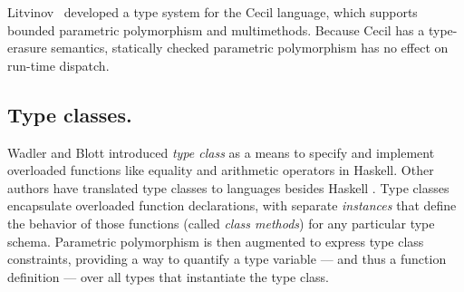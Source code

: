 Litvinov~\cite{litvinov98} developed a type system for the Cecil language,
which supports bounded parametric polymorphism and multimethods.
Because Cecil has a type-erasure semantics, 
statically checked parametric polymorphism has no effect on run-time dispatch.

\subsection{Type classes.} Wadler and Blott \cite{wadler89} introduced
\emph{type class} as a means to specify and implement overloaded
functions like equality and arithmetic operators in Haskell. Other authors
have translated type classes to languages besides Haskell \cite{dreyer07,siek05,wehr07}.
Type classes encapsulate overloaded function declarations, with separate
\emph{instances} that define the behavior of those functions (called \emph{class methods})
for any particular type schema. Parametric polymorphism is then augmented to
express type class constraints, providing a way to quantify a type variable --- and
thus a function definition --- over all types that instantiate the type class. 


